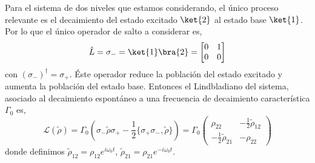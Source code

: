 Para el sistema de dos niveles que estamos considerando, el único proceso relevante es el decaimiento del estado excitado $\ket{2}$ al estado base $\ket{1}$. Por lo que el único operador de salto a considerar es,
    \begin{equation}
        \hat{L} =  \sigma_- =\ket{1}\bra{2} = \begin{bmatrix}
        0 & 1 \\
        0 & 0
        \end{bmatrix}
    \end{equation}
con $(\sigma_-)^\dagger = \sigma_+$. Éste operador reduce la población del estado excitado y aumenta la población del estado base. Entonces el Lindbladiano del sistema, asociado al decaimiento espontáneo a una frecuencia de decaimiento característica $\Gamma_0$ es,
\begin{equation}
    \mathcal{L}(\tilde{\rho}) = \Gamma_0 \left( \sigma_- \tilde{\rho} \sigma_+ - \frac{1}{2} \{\sigma_+ \sigma_-, \tilde{\rho}\} \right)= \Gamma_0 \begin{pmatrix}
    \rho_{22} & -\frac{1}{2} \tilde{\rho}_{12} \\
    -\frac{1}{2} \tilde{\rho}_{21} & -\rho_{22}
    \end{pmatrix}
\end{equation}
donde definimos $\tilde{\rho}_{12}= \rho_{12} e^{i \omega_0 t}$,  $\tilde{\rho}_{21}= \rho_{21} e^{-i \omega_0 t}$.

